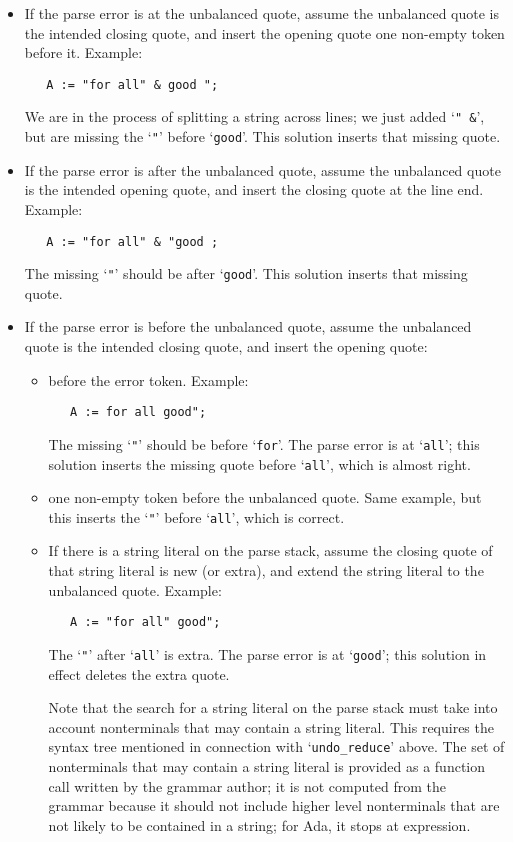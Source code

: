 \documentclass{article}
\newcommand{\code}[1]{`{\tt #1}'}
\begin{document}
\begin{itemize}
\item If the parse error is at the unbalanced quote, assume the unbalanced
quote is the intended closing quote, and insert the opening quote one
non-empty token before it. Example:
\begin{verbatim}
   A := "for all" & good ";
\end{verbatim}
We are in the process of splitting a string across lines; we just
added \code{" \&}, but are missing the \code{"} before \code{good}.
This solution inserts that missing quote.

\item If the parse error is after the unbalanced quote, assume the unbalanced
quote is the intended opening quote, and insert the closing quote at
the line end. Example:
\begin{verbatim}
   A := "for all" & "good ;
\end{verbatim}
The missing \code{"} should be after \code{good}.
This solution inserts that missing quote.

\item If the parse error is before the unbalanced quote, assume the unbalanced
quote is the intended closing quote, and insert the opening quote:

\begin{itemize}
\item before the error token. Example:
\begin{verbatim}
   A := for all good";
\end{verbatim}
The missing \code{"} should be before \code{for}. The parse error is at \code{all};
this solution inserts the missing quote before \code{all}, which is
almost right.

\item one non-empty token before the unbalanced quote. Same example,
  but this inserts the \code{"} before \code{all}, which is correct.

\item If there is a string literal on the parse stack,
assume the closing quote of that string literal is new (or extra),
and extend the string literal to the unbalanced quote. Example:
\begin{verbatim}
   A := "for all" good";
\end{verbatim}
The \code{"} after \code{all} is extra. The parse error is at \code{good};
this solution in effect deletes the extra quote.

Note that the search for a string literal on the parse stack must take
into account nonterminals that may contain a string literal. This
requires the syntax tree mentioned in connection with
\code{undo\_reduce} above. The set of nonterminals that may contain a
string literal is provided as a function call written by the grammar
author; it is not computed from the grammar because it should not
include higher level nonterminals that are not likely to be contained
in a string; for Ada, it stops at expression.
\end{itemize}
\end{itemize}
\end{document}
